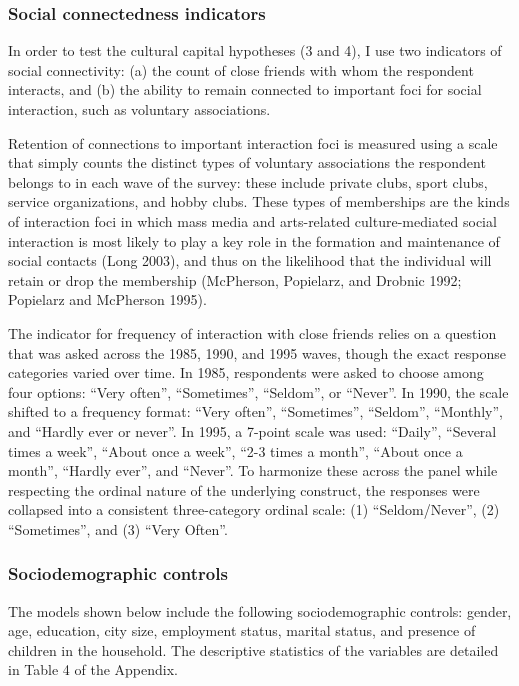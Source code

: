 \documentclass[
]{article}
\begin{document}
\subsubsection{Social connectedness indicators}\label{social-connectedness-indicators}

In order to test the cultural capital hypotheses (3 and 4), I use two indicators of social connectivity: (a) the count of close friends with whom the respondent interacts, and (b) the ability to remain connected to important foci for social interaction, such as voluntary associations. 

Retention of connections to important interaction foci is measured using a scale that simply counts the distinct types of voluntary associations the respondent belongs to in each wave of the survey: these include private clubs, sport clubs, service organizations, and hobby clubs. These types of memberships are the kinds of interaction foci in which mass media and arts-related culture-mediated social interaction is most likely to play a key role in the formation and maintenance of social contacts (Long 2003), and thus on the likelihood that the individual will retain or drop the membership (McPherson, Popielarz, and Drobnic 1992; Popielarz and McPherson 1995).

The indicator for frequency of interaction with close friends relies on a question that was asked across the 1985, 1990, and 1995 waves, though the exact response categories varied over time. In 1985, respondents were asked to choose among four options: ``Very often'', ``Sometimes'', ``Seldom'', or ``Never''. In 1990, the scale shifted to a frequency format: ``Very often'', ``Sometimes'', ``Seldom'', ``Monthly'', and ``Hardly ever or never''. In 1995, a 7-point scale was used: ``Daily'', ``Several times a week'', ``About once a week'', ``2-3 times a month'', ``About once a month'', ``Hardly ever'', and ``Never''. To harmonize these across the panel while respecting the ordinal nature of the underlying construct, the responses were collapsed into a consistent three-category ordinal scale: (1) ``Seldom/Never'', (2) ``Sometimes'', and (3) ``Very Often''.

\subsubsection{Sociodemographic controls}\label{sociodemographic-controls}

The models shown below include the following sociodemographic controls: gender, age, education, city size, employment status, marital status, and presence of children in the household. The descriptive statistics of the variables are detailed in Table 4 of the Appendix.
\end{document}
